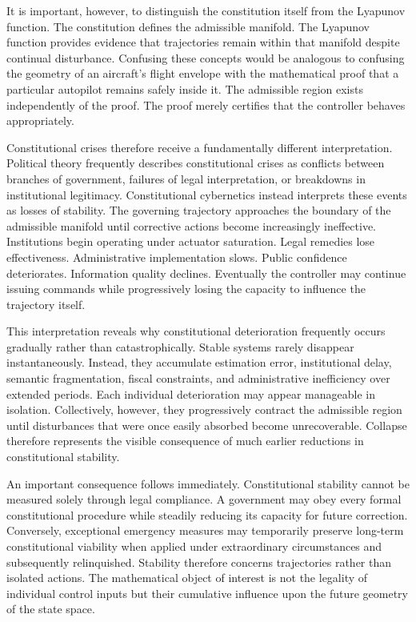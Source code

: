 \documentclass[12pt,a4paper]{article}
\begin{document}
It is important, however, to distinguish the constitution itself from the Lyapunov function. The constitution defines the admissible manifold. The Lyapunov function provides evidence that trajectories remain within that manifold despite continual disturbance. Confusing these concepts would be analogous to confusing the geometry of an aircraft's flight envelope with the mathematical proof that a particular autopilot remains safely inside it. The admissible region exists independently of the proof. The proof merely certifies that the controller behaves appropriately.

Constitutional crises therefore receive a fundamentally different interpretation. Political theory frequently describes constitutional crises as conflicts between branches of government, failures of legal interpretation, or breakdowns in institutional legitimacy. Constitutional cybernetics instead interprets these events as losses of stability. The governing trajectory approaches the boundary of the admissible manifold until corrective actions become increasingly ineffective. Institutions begin operating under actuator saturation. Legal remedies lose effectiveness. Administrative implementation slows. Public confidence deteriorates. Information quality declines. Eventually the controller may continue issuing commands while progressively losing the capacity to influence the trajectory itself.

This interpretation reveals why constitutional deterioration frequently occurs gradually rather than catastrophically. Stable systems rarely disappear instantaneously. Instead, they accumulate estimation error, institutional delay, semantic fragmentation, fiscal constraints, and administrative inefficiency over extended periods. Each individual deterioration may appear manageable in isolation. Collectively, however, they progressively contract the admissible region until disturbances that were once easily absorbed become unrecoverable. Collapse therefore represents the visible consequence of much earlier reductions in constitutional stability.

An important consequence follows immediately. Constitutional stability cannot be measured solely through legal compliance. A government may obey every formal constitutional procedure while steadily reducing its capacity for future correction. Conversely, exceptional emergency measures may temporarily preserve long-term constitutional viability when applied under extraordinary circumstances and subsequently relinquished. Stability therefore concerns trajectories rather than isolated actions. The mathematical object of interest is not the legality of individual control inputs but their cumulative influence upon the future geometry of the state space.
\end{document}
